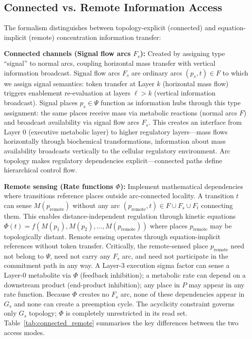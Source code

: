 \documentclass[10pt,letterpaper]{article}
\begin{document}
\subsection{Connected vs. Remote Information Access}
\label{sec:unified}

The formalism distinguishes between topology-explicit (connected) and equation-implicit (remote) concentration information transfer:

\textbf{Connected channels (Signal flow arcs $F_s$):} Created by assigning type ``signal'' to normal arcs, coupling horizontal mass transfer with vertical information broadcast. Signal flow arcs $F_s$ are ordinary arcs $(p_s, t) \in F$ to which we assign signal semantics: token transfer at Layer $k$ (horizontal mass flow) triggers enablement re-evaluation at layers $\ell > k$ (vertical information broadcast). Signal places $p_s \in \Psi$ function as information hubs through this type assignment: the same places receive mass via metabolic reactions (normal arcs $F$) and broadcast availability via signal flow arcs $F_s$. This creates an interface from Layer 0 (executive metabolic layer) to higher regulatory layers---mass flows horizontally through biochemical transformations, information about mass availability broadcasts vertically to the cellular regulatory environment. Arc topology makes regulatory dependencies explicit---connected paths define hierarchical control flow.

\textbf{Remote sensing (Rate functions $\Phi$):} Implement mathematical dependencies where transitions reference places outside arc-connected locality. A transition $t$ can sense $M(p_{\text{remote}})$ without any arc
$(p_{\text{remote}}, t) \in F \cup F_s \cup F_t$
connecting them. This enables distance-independent regulation through kinetic equations
$\Phi(t) = f(M(p_1), M(p_2), \ldots, M(p_{\text{remote}}))$
where places $p_{\text{remote}}$ may be topologically distant. Remote sensing operates through equation-implicit references without token transfer.
Critically, the remote-sensed place $p_{\text{remote}}$ need not belong to $\Psi$, need not carry any $F_s$ arc, and need not participate in the commitment path in any way. A Layer-3 execution sigma factor can sense a Layer-0 metabolite via $\Phi$ (feedback inhibition); a metabolic rate can depend on a downstream product (end-product inhibition); any place in $P$ may appear in any rate function. Because $\Phi$ creates no $F_s$ arc, none of these dependencies appear in $G_s$ and none can create a preemption cycle. The acyclicity constraint governs only $G_s$ topology; $\Phi$ is completely unrestricted in its read set.
Table~\ref{tab:connected_remote} summarises the key differences between the two access modes.
\end{document}
